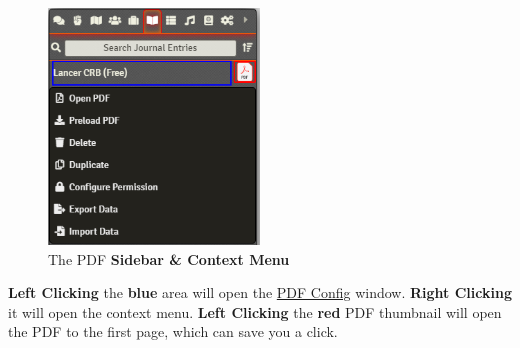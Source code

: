 \documentclass{article}
\begin{document}
    \begin{figure}[h]
        \centering
        \includegraphics[width=0.5\textwidth]{images/new-pdf-sidebar.png}
        \caption{The PDF \textbf{Sidebar \& Context Menu}}
        \label{fig:new-pdf-sidebar}
    \end{figure}

    \textbf{Left Clicking} the \textbf{blue} area will open the \hyperref[sec:creating-opening-pdfs]{PDF Config} window. \textbf{Right Clicking} it will open the context menu. \textbf{Left Clicking} the \textbf{red} PDF thumbnail will open the PDF to the first page, which can save you a click.
\end{document}
